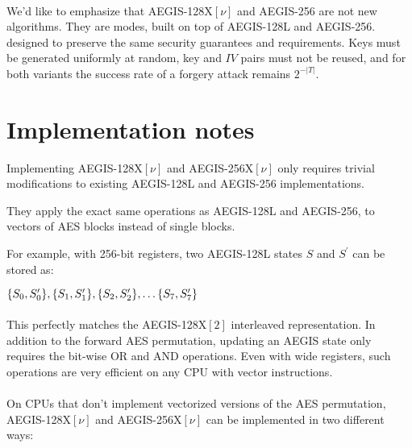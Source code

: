 \documentclass[envcountsame,runningheads,notitlepage]{llncs}
\begin{document}
\paragraph{}

We'd like to emphasize that AEGIS-128X$[\nu]$ and AEGIS-256 are not new algorithms. They are modes, built on top of AEGIS-128L and AEGIS-256. designed to preserve the same security guarantees and requirements.
Keys must be generated uniformly at random, key and $IV$ pairs must not be reused, and for both variants the success rate of a forgery attack remains $2^{-\lvert T \rvert}$.

\section{Implementation notes}
\label{sec:implementation notes}

Implementing AEGIS-128X$[\nu]$ and AEGIS-256X$[\nu]$ only requires trivial modifications to existing AEGIS-128L and AEGIS-256 implementations.

They apply the exact same operations as AEGIS-128L and AEGIS-256, to vectors of AES blocks instead of single blocks.

For example, with 256-bit registers, two AEGIS-128L states $S$ and $S^{\prime}$ can be stored as:

\begin{math}
  \\
  \{ S_0, S^{\prime}_0 \}, \{ S_1, S^{\prime}_1 \}, \{ S_2, S^{\prime}_2 \}, \ldots \{ S_7, S^{\prime}_7 \}
\end{math}

\paragraph{}

This perfectly matches the AEGIS-128X$[2]$ interleaved representation. In addition to the forward AES permutation, updating an AEGIS state only requires the bit-wise OR and AND operations. Even with wide registers, such operations are very efficient on any CPU with vector instructions.

\paragraph{}

On CPUs that don't implement vectorized versions of the AES permutation, AEGIS-128X$[\nu]$ and AEGIS-256X$[\nu]$ can be implemented in two different ways:
\end{document}

